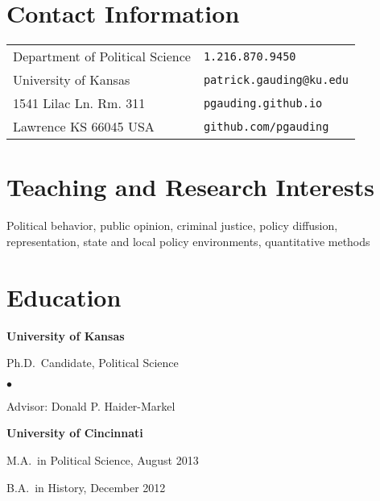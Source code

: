 \documentclass[margin,line,pifont,palatino,courier]{res}
\newenvironment{list1}{
  \begin{list}{\ding{113}}{%
      \setlength{\itemsep}{0in}
      \setlength{\parsep}{0in} \setlength{\parskip}{0in}
      \setlength{\topsep}{0in} \setlength{\partopsep}{0in}
      \setlength{\leftmargin}{0.17in}}}{\end{list}}
\newenvironment{list2}{
  \begin{list}{$\bullet$}{%
      \setlength{\itemsep}{0in}
      \setlength{\parsep}{0in} \setlength{\parskip}{0in}
      \setlength{\topsep}{0in} \setlength{\partopsep}{0in}
      \setlength{\leftmargin}{0.2in}}}{\end{list}}
\begin{document}

\begin{resume}

\section{\sc Contact Information}

\vspace{.05in}
\begin{tabular}{@{}p{2.75in}p{2in}}
Department of Political Science & \verb+1.216.870.9450+ \\
University of Kansas            & \verb+patrick.gauding@ku.edu+\\
1541 Lilac Ln. Rm. 311          & \verb+pgauding.github.io+\\
Lawrence KS 66045 USA           & \verb+github.com/pgauding+\\
\end{tabular}

\section{\sc Teaching and Research Interests}
Political behavior, public opinion, criminal justice, policy diffusion, representation, state and local policy environments, quantitative methods

\section{\sc Education}

{\bf University of Kansas}\\
\begin{list1}
\item[] Ph.D.~Candidate, Political Science %

\begin{list2}
\vspace*{.05in}
\item Advisor: Donald P. Haider-Markel
\end{list2}
\end{list1}

{\bf University of Cincinnati}\\
\begin{list1}
\item[] M.A.~in Political Science, August 2013
\item[] B.A.~in History, December 2012


\end{list1}
\end{resume}
\end{document}
